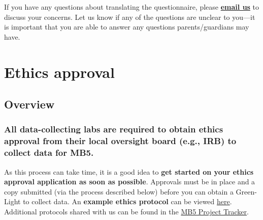 \documentclass[
  letterpaper,
  DIV=11,
  numbers=noendperiod,
  oneside]{scrreprt}
\begin{document}
If you have any questions about translating the questionnaire, please
\href{mailto:mb5@manybabies.org}{\textbf{email us}} to discuss your
concerns. Let us know if any of the questions are unclear to you---it is
important that you are able to answer any questions parents/guardians
may have.

\chapter{Ethics approval}\label{sec-ethics}

\section{Overview}\label{overview-1}

\subsection[All data-collecting labs are required to obtain ethics
approval from their local oversight board (e.g., IRB) to collect data
for \textbf{MB5}.]{\texorpdfstring{All data-collecting labs are required
to obtain ethics approval from their local oversight board (e.g.,
IRB) to collect
data for
\textbf{MB5}.}{All data-collecting labs are required to obtain ethics approval from their local oversight board (e.g., IRB) to collect data for MB5.}}\label{all-data-collecting-labs-are-required-to-obtain-ethics-approval-from-their-local-oversight-board-e.g.-irb-to-collect-data-for-.}

As this process can take time, it is a good idea to \textbf{get started
on your ethics approval application as soon as possible}. Approvals must
be in place and a copy submitted (via the process described below)
before you can obtain a Green-Light to collect data. An \textbf{example
ethics protocol} can be viewed
\href{https://docs.google.com/document/d/e/2PACX-1vRA7WJbMr-NCoqQ7eFfE9nthZPsLFlTw9_mTAX1PY2nAqLfec77MJn-Phq1zwGX4w/pub}{here}. Additional protocols shared with us
can be found in the \href{https://manybabies.org/mb5-tracker}{MB5
Project Tracker}.
\end{document}
